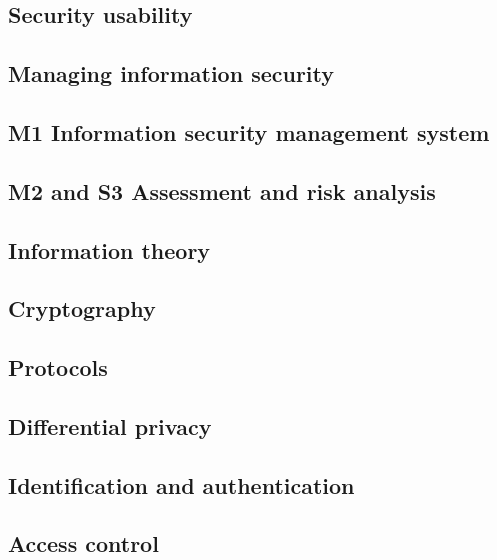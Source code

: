 \subsection{Security usability}


\subsection{Managing information security}


\subsection{M1 Information security management system}


\subsection{M2 and S3 Assessment and risk analysis}


\subsection{Information theory}


\subsection{Cryptography}


\subsection{Protocols}


\subsection{Differential privacy}


\subsection{Identification and authentication}


\subsection{Access control}


